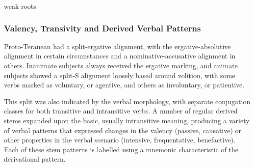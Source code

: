 \documentclass[grammar]{subfiles}
\begin{document}
\Tbw weak roots

\subsubsection{Valency, Transivity and Derived Verbal Patterns}
\label{sssec:history:pt:vm:valency_transivity_verbal_patterns}

Proto-Teranean had a split-ergative alignment, with the ergative-absolutive
alignment in certain circumstances and a nominative-accusative alignment in
others.  Inanimate subjects always received the ergative marking, and animate
subjects showed a split-S alignment loosely based around volition, with some
verbs marked as voluntary, or agentive, and others as involuntary, or
patientive.  

This split was also indicated by the verbal morphology, with separate
conjugation classes for both transitive and intransitive verbs.  A number of
regular derived stems expanded upon the basic, usually intransitive meaning,
producing a variety of verbal patterns that expressed changes in the valency
(passive, causative) or other properties in the verbal scenario (intensive,
frequentative, benefactive).  Each of these stem patterns is labelled using a
mnemonic characteristic of the derivational pattern.
\end{document}
